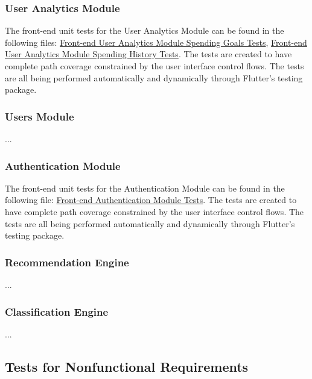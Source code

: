 \documentclass[12pt, titlepage]{article}
\begin{document}
\subsubsection{User Analytics Module}
The front-end unit tests for the User Analytics Module can be found in the following files: \href{https://github.com/allanfang1/grocery_spending_tracker_app/blob/main/test/goals_provider_test.dart}{Front-end User Analytics Module Spending Goals Tests}, \href{https://github.com/allanfang1/grocery_spending_tracker_app/blob/main/test/history_provider_test.dart}{Front-end User Analytics Module Spending History Tests}. The tests are created to have complete path coverage constrained by the user interface control flows. The tests are all being performed automatically and dynamically through Flutter's testing package.


\subsubsection{Users Module}

...

\subsubsection{Authentication Module}
The front-end unit tests for the Authentication Module can be found in the following file: \href{https://github.com/allanfang1/grocery_spending_tracker_app/blob/main/test/profile_provider_test.dart}{Front-end Authentication Module Tests}. The tests are created to have complete path coverage constrained by the user interface control flows. The tests are all being performed automatically and dynamically through Flutter's testing package.

\subsubsection{Recommendation Engine}

...

\subsubsection{Classification Engine}

...

\subsection{Tests for Nonfunctional Requirements}
\end{document}
